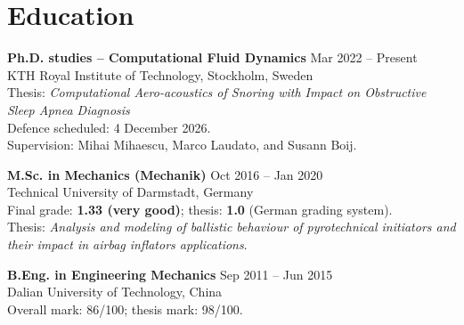 \documentclass[a4paper,10pt]{article}
\begin{document}
\newpage

\section{Education}
\textbf{Ph.D. studies -- Computational Fluid Dynamics}
\hfill Mar 2022 -- Present\\
KTH Royal Institute of Technology, Stockholm, Sweden\\
Thesis: \textit{Computational Aero-acoustics of Snoring with Impact on Obstructive Sleep Apnea Diagnosis}\\
Defence scheduled: 4 December 2026.\\
Supervision: Mihai Mihaescu, Marco Laudato, and Susann Boij.

\vspace{5pt}
\textbf{M.Sc. in Mechanics (Mechanik)} \hfill Oct 2016 -- Jan 2020\\
Technical University of Darmstadt, Germany\\
Final grade: \textbf{1.33 (very good)}; thesis: \textbf{1.0} (German grading system).\\
Thesis: \textit{Analysis and modeling of ballistic behaviour of pyrotechnical initiators
and their impact in airbag inflators applications}.

\vspace{5pt}
\textbf{B.Eng. in Engineering Mechanics} \hfill Sep 2011 -- Jun 2015\\
Dalian University of Technology, China\\
Overall mark: 86/100; thesis mark: 98/100.
\end{document}
